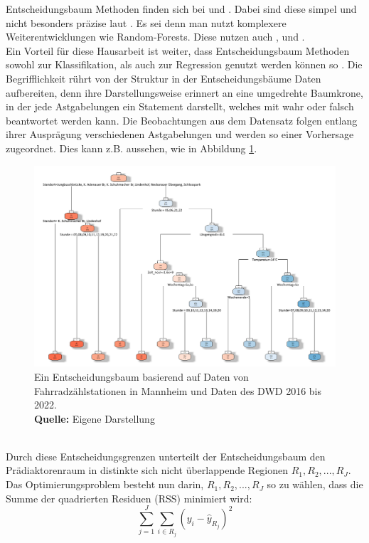 \documentclass[a4paper,12pt]{thesis}
\newcommand*{\captionsource}[2]{%
	\caption[{#1}]{%
		#1%
		\\\hspace{\linewidth}%
		\textbf{Quelle:} #2%
	}%
}
\begin{document}
Entscheidungsbaum Methoden finden sich bei \cite{Mitchell2018PredictingBT} und \cite{Gao2022}. Dabei sind diese simpel und nicht besonders präzise laut \cite{James2013TBM}. Es sei denn man nutzt komplexere Weiterentwicklungen wie Random-Forests. Diese nutzen auch \cite{Holmgren2017}, \cite{Broucke2019} und \cite{Mitchell2018PredictingBT}.\\ 
Ein Vorteil für diese Hausarbeit ist weiter, dass Entscheidungsbaum Methoden sowohl zur Klassifikation, als auch zur Regression genutzt werden können so \cite{James2013TBM}. Die Begrifflichkeit rührt von der Struktur in der Entscheidungsbäume Daten aufbereiten, denn ihre Darstellungsweise erinnert an eine umgedrehte Baumkrone, in der jede Astgabelungen ein Statement darstellt, welches mit wahr oder falsch beantwortet werden kann. Die Beobachtungen aus dem Datensatz folgen entlang ihrer Ausprägung verschiedenen Astgabelungen und werden so einer Vorhersage zugeordnet. Dies kann z.B. aussehen, wie in Abbildung \ref{DTM1}.
\begin{figure}[!ht]
	\centering
	\includegraphics[width=16cm]{Plots/Entscheidungsbaum.png}
	\captionsource{Ein Entscheidungsbaum basierend auf Daten von Fahrradzählstationen in Mannheim und Daten des DWD 2016 bis 2022.}{
		Eigene Darstellung
	}
	\label{DTM1}
\end{figure}\\
Durch diese Entscheidungsgrenzen unterteilt der Entscheidungsbaum den Prädiaktorenraum in distinkte sich nicht überlappende Regionen $R_1,R_2,...,R_J$. Das Optimierungsproblem besteht nun darin, $R_1,R_2,...,R_J$ so zu wählen, dass die Summe der quadrierten Residuen (RSS) minimiert wird: 
\begin{equation}
	\label{TDM:TreeOptimization}
	\sum_{j=1}^J\sum_{i\in R_j}(y_i - \hat{y}_{R_j})^2
\end{equation}
\end{document}
